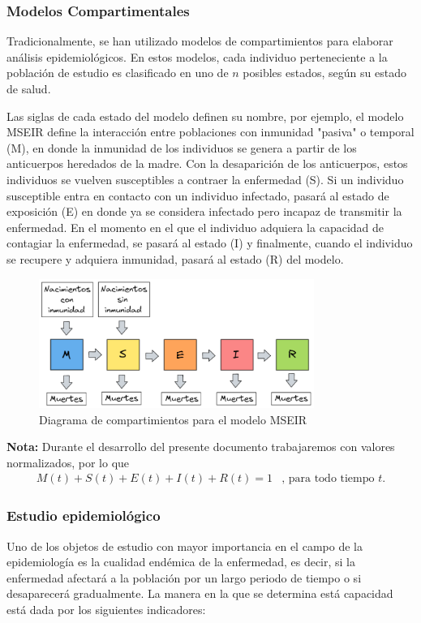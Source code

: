 \subsubsection{Modelos Compartimentales}

Tradicionalmente, se han utilizado modelos de compartimientos para elaborar análisis epidemiológicos. En estos modelos, cada individuo perteneciente a la población de estudio es clasificado en uno de $n$ posibles estados, según su estado de salud.

Las siglas de cada estado del modelo definen su nombre, por ejemplo, el modelo MSEIR define la interacción entre poblaciones con inmunidad "pasiva" o temporal (M), en donde la inmunidad de los individuos se genera a partir de los anticuerpos heredados de la madre. Con la desaparición de los anticuerpos, estos individuos se vuelven susceptibles a contraer la enfermedad (S). Si un individuo susceptible entra en contacto con un individuo infectado, pasará al estado de exposición (E) en donde ya se considera infectado pero incapaz de transmitir la enfermedad. En el momento en el que el individuo adquiera la capacidad de contagiar la enfermedad, se pasará al estado (I) y finalmente, cuando el individuo se recupere y adquiera inmunidad, pasará al estado (R) del modelo.\cite{modelCompartimental}

\begin{figure}[h]
  \centering
    \includegraphics[width=0.8\textwidth]{Imagenes/MSEIR_compatimientos.PNG}
  \caption{Diagrama de compartimientos para el modelo MSEIR}
  \label{fig:ejemplo}
\end{figure}

\textbf{Nota:} Durante el desarrollo del presente documento trabajaremos con valores normalizados, por lo que 
$$\begin{array}{cc}
    M(t) + S(t) + E(t) + I(t) + R(t) = 1 & \text{, para todo tiempo }t.
\end{array} $$

\subsubsection{Estudio epidemiológico}
Uno de los objetos de estudio con mayor importancia en el campo de la epidemiología es la cualidad endémica de la enfermedad, es decir, si la enfermedad afectará a la población por un largo periodo de tiempo o si desaparecerá gradualmente. La manera en la que se determina está capacidad está dada por los siguientes indicadores:

